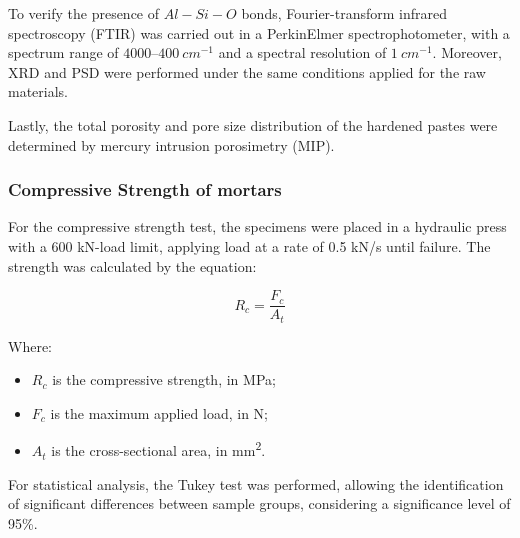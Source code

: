 To verify the presence of $Al-Si-O$ bonds, Fourier-transform infrared spectroscopy (FTIR) was carried out in a PerkinElmer spectrophotometer, with a spectrum range of $4000$–$400\ cm^{-1}$ and a spectral resolution of $1\ cm^{-1}$.
Moreover, XRD and PSD were performed under the same conditions applied for the raw materials.

Lastly, the total porosity and pore size distribution of the hardened pastes were determined by mercury intrusion porosimetry (MIP).

\subsubsection{Compressive Strength of mortars}
\label{sec:compressive_strength}

For the compressive strength test, the specimens were placed in a hydraulic press with  a 600 kN-load limit, applying load at a rate of 0.5 kN/s until failure. The strength was calculated by the equation:

\begin{equation}
    \label{eq:compressive_strength}
    R_c = \frac{F_c}{A_t}
\end{equation}

Where:
\begin{itemize}
    \item $R_c$ is the compressive strength, in MPa;
    \item $F_c$ is the maximum applied load, in N;
    \item $A_t$ is the cross-sectional area, in mm\textsuperscript{2}.
\end{itemize}

For statistical analysis, the Tukey test was performed, allowing the identification of significant differences between sample groups, considering a significance level of 95\%.




